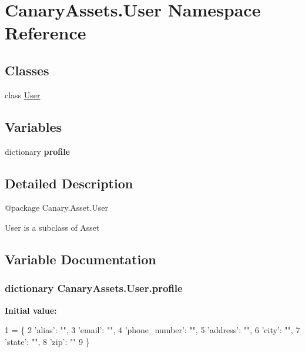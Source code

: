 \hypertarget{namespace_canary_assets_1_1_user}{\section{Canary\-Assets.\-User Namespace Reference}
\label{namespace_canary_assets_1_1_user}
}
\subsection*{Classes}
\begin{DoxyCompactItemize}
\item 
class \hyperlink{class_canary_assets_1_1_user_1_1_user}{User}
\end{DoxyCompactItemize}
\subsection*{Variables}
\begin{DoxyCompactItemize}
\item 
dictionary {\bfseries profile}
\end{DoxyCompactItemize}


\subsection{Detailed Description}
\begin{DoxyVerb}@package Canary.Asset.User

User is a subclass of Asset
\end{DoxyVerb}
 

\subsection{Variable Documentation}
\hypertarget{namespace_canary_assets_1_1_user_ac2cf8830f78f5a7e3f81e348616c5ff0}{
\subsubsection[{profile}]{\setlength{\rightskip}{0pt plus 5cm}dictionary Canary\-Assets.\-User.\-profile}}\label{namespace_canary_assets_1_1_user_ac2cf8830f78f5a7e3f81e348616c5ff0}
{\bfseries Initial value\-:}
\begin{DoxyCode}
1 = \{
2     \textcolor{stringliteral}{'alias'}: \textcolor{stringliteral}{""},
3     \textcolor{stringliteral}{'email'}: \textcolor{stringliteral}{""},
4     \textcolor{stringliteral}{'phone\_number'}: \textcolor{stringliteral}{""},
5     \textcolor{stringliteral}{'address'}: \textcolor{stringliteral}{""},
6     \textcolor{stringliteral}{'city'}: \textcolor{stringliteral}{""},
7     \textcolor{stringliteral}{'state'}: \textcolor{stringliteral}{""},
8     \textcolor{stringliteral}{'zip'}: \textcolor{stringliteral}{""}
9 \}
\end{DoxyCode}
